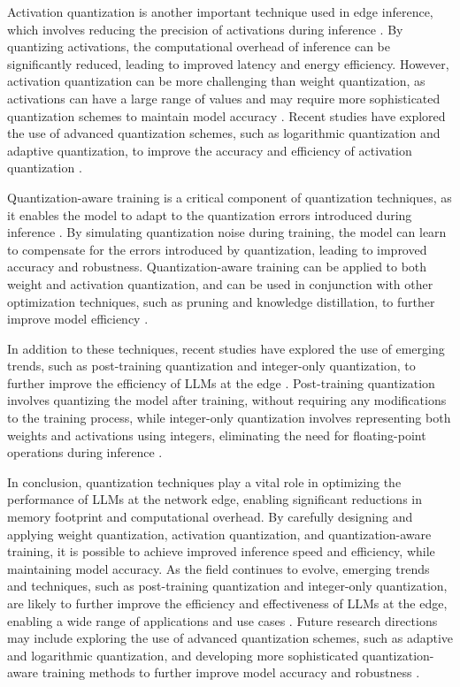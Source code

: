 \documentclass[11pt,a4paper]{article}
\begin{document}
Activation quantization is another important technique used in edge inference, which involves reducing the precision of activations during inference \cite{doi:10.1109/hpec58863.2023.10363447}. By quantizing activations, the computational overhead of inference can be significantly reduced, leading to improved latency and energy efficiency. However, activation quantization can be more challenging than weight quantization, as activations can have a large range of values and may require more sophisticated quantization schemes to maintain model accuracy \cite{doi:10.1109/access.2024.3409745}. Recent studies have explored the use of advanced quantization schemes, such as logarithmic quantization and adaptive quantization, to improve the accuracy and efficiency of activation quantization \cite{doi:10.1109/access.2024.3424945}.

Quantization-aware training is a critical component of quantization techniques, as it enables the model to adapt to the quantization errors introduced during inference \cite{doi:10.1109/ojcs.2025.3580498}. By simulating quantization noise during training, the model can learn to compensate for the errors introduced by quantization, leading to improved accuracy and robustness. Quantization-aware training can be applied to both weight and activation quantization, and can be used in conjunction with other optimization techniques, such as pruning and knowledge distillation, to further improve model efficiency \cite{doi:10.1609/aaai.v37i9.26255}.

In addition to these techniques, recent studies have explored the use of emerging trends, such as post-training quantization and integer-only quantization, to further improve the efficiency of LLMs at the edge \cite{doi:10.1145/3767742}. Post-training quantization involves quantizing the model after training, without requiring any modifications to the training process, while integer-only quantization involves representing both weights and activations using integers, eliminating the need for floating-point operations during inference \cite{doi:10.1145/3754448}.

In conclusion, quantization techniques play a vital role in optimizing the performance of LLMs at the network edge, enabling significant reductions in memory footprint and computational overhead. By carefully designing and applying weight quantization, activation quantization, and quantization-aware training, it is possible to achieve improved inference speed and efficiency, while maintaining model accuracy. As the field continues to evolve, emerging trends and techniques, such as post-training quantization and integer-only quantization, are likely to further improve the efficiency and effectiveness of LLMs at the edge, enabling a wide range of applications and use cases \cite{doi:10.1109/comst.2025.3527641}. Future research directions may include exploring the use of advanced quantization schemes, such as adaptive and logarithmic quantization, and developing more sophisticated quantization-aware training methods to further improve model accuracy and robustness \cite{doi:10.1109/mnet.2025.3539338}.
\end{document}
